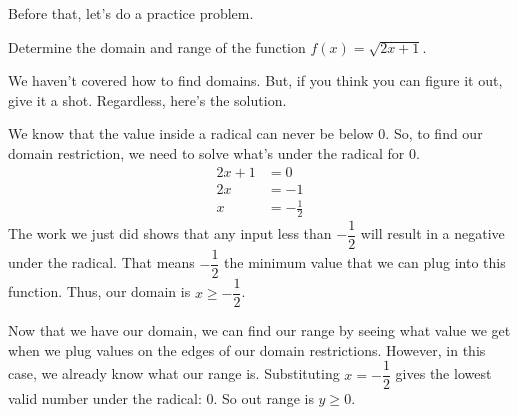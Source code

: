 Before that, let's do a practice problem.

\begin{problem}
    Determine the domain and range of the function $f(x) = \sqrt{2x + 1}$.
\end{problem}
We haven't covered how to find domains. But, if you think you can figure it out, give it a shot. Regardless, here's the solution.
\begin{solution}
    We know that the value inside a radical can never be below $0$. So, to find our domain restriction, we need to solve what's under the radical for $0$.
    \begin{align*}
        2x + 1 &= 0 \\
        2x &= -1 \\
        x &= -\frac{1}{2}
    \end{align*}
    The work we just did shows that any input less than $-\dfrac{1}{2}$ will result in a negative under the radical. That means $-\dfrac{1}{2}$ the minimum value that we can plug into this function. Thus, our domain is $x \ge -\dfrac{1}{2}$.

    Now that we have our domain, we can find our range by seeing what value we get when we plug values on the edges of our domain restrictions. However, in this case, we already know what our range is. Substituting $x = -\dfrac{1}{2}$ gives the lowest valid number under the radical: $0$. So out range is $y \ge 0$.

\end{solution}